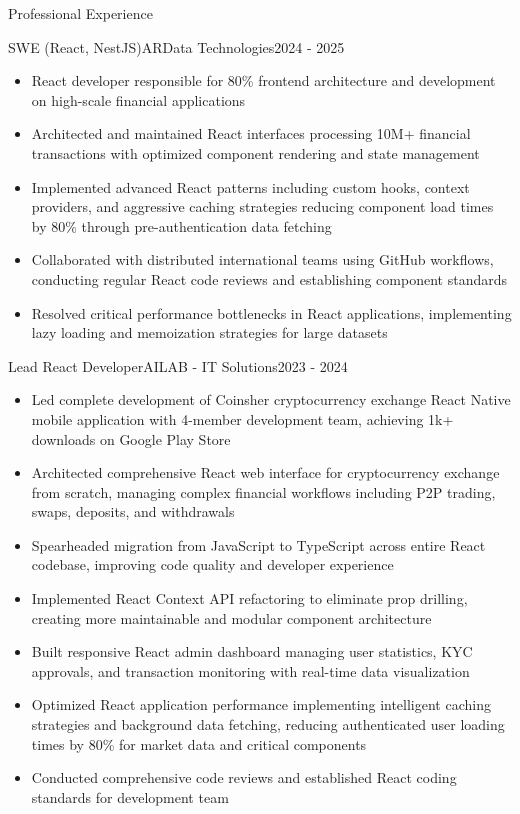 \documentclass[]{mcdowellcv}
\begin{document}
	\begin{cvsection}{Professional Experience}
    \begin{cvsubsection}{SWE (React, NestJS)}{ARData Technologies}{2024 - 2025}		
			\begin{itemize}
        \item React developer responsible for 80\% frontend architecture and development on high-scale financial applications
        \item Architected and maintained React interfaces processing 10M+ financial transactions with optimized component rendering and state management
        \item Implemented advanced React patterns including custom hooks, context providers, and aggressive caching strategies reducing component load times by 80\% through pre-authentication data fetching
        \item Collaborated with distributed international teams using GitHub workflows, conducting regular React code reviews and establishing component standards
        \item Resolved critical performance bottlenecks in React applications, implementing lazy loading and memoization strategies for large datasets
			\end{itemize}
		\end{cvsubsection}

		\pagebreak
		
		\begin{cvsubsection}{Lead React Developer}{AILAB - IT Solutions}{2023 - 2024}
			\begin{itemize}
				\item Led complete development of Coinsher cryptocurrency exchange React Native mobile application with 4-member development team, achieving 1k+ downloads on Google Play Store
				\item Architected comprehensive React web interface for cryptocurrency exchange from scratch, managing complex financial workflows including P2P trading, swaps, deposits, and withdrawals
				\item Spearheaded migration from JavaScript to TypeScript across entire React codebase, improving code quality and developer experience
				\item Implemented React Context API refactoring to eliminate prop drilling, creating more maintainable and modular component architecture
				\item Built responsive React admin dashboard managing user statistics, KYC approvals, and transaction monitoring with real-time data visualization
				\item Optimized React application performance implementing intelligent caching strategies and background data fetching, reducing authenticated user loading times by 80\% for market data and critical components
				\item Conducted comprehensive code reviews and established React coding standards for development team
			\end{itemize}
		\end{cvsubsection}
		

\end{cvsection}
\end{document}
